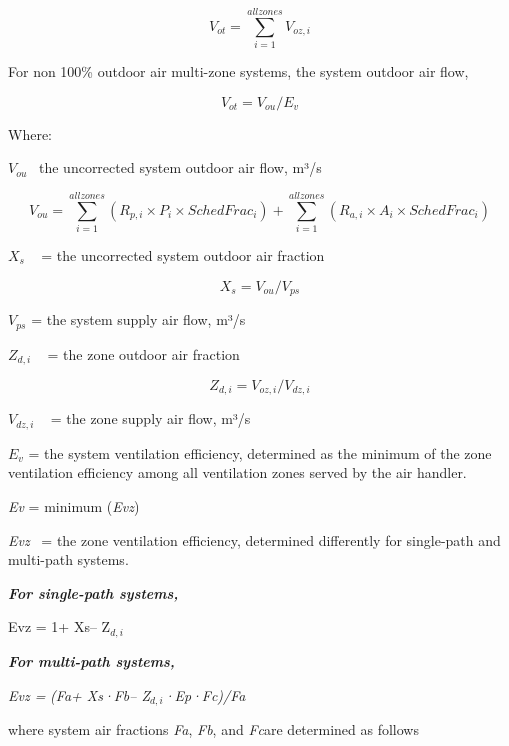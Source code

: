 \begin{equation}
{V_{ot}} = \mathop \sum \limits_{i = 1}^{allzones} {V_{oz,i}}
\end{equation}

For non 100\% outdoor air multi-zone systems, the system outdoor air flow,

\begin{equation}
{V_{ot}} = {V_{ou}}/{E_v}
\end{equation}

Where:

\({V_{ou}}\) ~the uncorrected system outdoor air flow, m³/s

\begin{equation}
{V_{ou}} = \mathop \sum \limits_{i = 1}^{allzones} ({R_{p,i}} \times {P_i} \times {SchedFrac_i}) + \mathop \sum \limits_{i = 1}^{allzones} ({R_{a,i}} \times {A_i} \times {SchedFrac_i})
\end{equation}

\({X_s}\) ~ = the uncorrected system outdoor air fraction

\begin{equation}
{X_s} = {V_{ou}}/{V_{ps}}
\end{equation}

\({V_{ps}}\) = the system supply air flow, m³/s

\({Z_{d,i}}\) ~ = the zone outdoor air fraction

\begin{equation}
{Z_{d,i}} = {V_{oz,i}}/{V_{dz,i}}
\end{equation}

\({V_{dz,i}}\) ~ = the zone supply air flow, m³/s

\({E_v}\) = the system ventilation efficiency, determined as the minimum of the zone ventilation efficiency among all ventilation zones served by the air handler.

\emph{Ev} = minimum (\emph{Evz})

\emph{Evz}~ = the zone ventilation efficiency, determined differently for single-path and multi-path systems.

\textbf{\emph{For single-path systems,}}

Evz = 1+ Xs-- Z\(_{d,i}\)

\textbf{\emph{For multi-path systems,}}

\emph{Evz =} \emph{(Fa+ Xs·Fb-- Z\(_{d,i}\)·Ep·Fc)/Fa}

where system air fractions \emph{Fa}, \emph{Fb}, and \emph{Fc}are determined as follows


